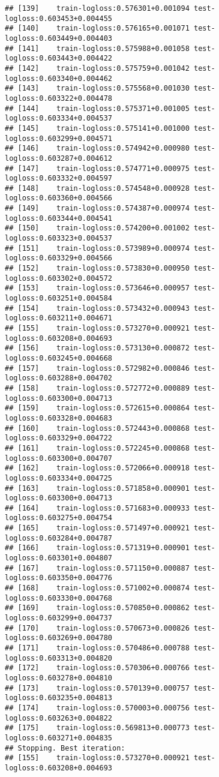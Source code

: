 \documentclass[
]{article}
\begin{document}
\begin{verbatim}
## [139]    train-logloss:0.576301+0.001094 test-logloss:0.603453+0.004455 
## [140]    train-logloss:0.576165+0.001071 test-logloss:0.603449+0.004403 
## [141]    train-logloss:0.575988+0.001058 test-logloss:0.603443+0.004422 
## [142]    train-logloss:0.575759+0.001042 test-logloss:0.603340+0.004462 
## [143]    train-logloss:0.575568+0.001030 test-logloss:0.603322+0.004478 
## [144]    train-logloss:0.575371+0.001005 test-logloss:0.603334+0.004537 
## [145]    train-logloss:0.575141+0.001000 test-logloss:0.603299+0.004571 
## [146]    train-logloss:0.574942+0.000980 test-logloss:0.603287+0.004612 
## [147]    train-logloss:0.574771+0.000975 test-logloss:0.603332+0.004597 
## [148]    train-logloss:0.574548+0.000928 test-logloss:0.603360+0.004566 
## [149]    train-logloss:0.574387+0.000974 test-logloss:0.603344+0.004541 
## [150]    train-logloss:0.574200+0.001002 test-logloss:0.603323+0.004537 
## [151]    train-logloss:0.573989+0.000974 test-logloss:0.603329+0.004566 
## [152]    train-logloss:0.573830+0.000950 test-logloss:0.603302+0.004572 
## [153]    train-logloss:0.573646+0.000957 test-logloss:0.603251+0.004584 
## [154]    train-logloss:0.573432+0.000943 test-logloss:0.603211+0.004671 
## [155]    train-logloss:0.573270+0.000921 test-logloss:0.603208+0.004693 
## [156]    train-logloss:0.573130+0.000872 test-logloss:0.603245+0.004668 
## [157]    train-logloss:0.572982+0.000846 test-logloss:0.603288+0.004702 
## [158]    train-logloss:0.572772+0.000889 test-logloss:0.603300+0.004713 
## [159]    train-logloss:0.572615+0.000864 test-logloss:0.603328+0.004683 
## [160]    train-logloss:0.572443+0.000868 test-logloss:0.603329+0.004722 
## [161]    train-logloss:0.572245+0.000868 test-logloss:0.603300+0.004707 
## [162]    train-logloss:0.572066+0.000918 test-logloss:0.603334+0.004725 
## [163]    train-logloss:0.571858+0.000901 test-logloss:0.603300+0.004713 
## [164]    train-logloss:0.571683+0.000933 test-logloss:0.603275+0.004754 
## [165]    train-logloss:0.571497+0.000921 test-logloss:0.603284+0.004787 
## [166]    train-logloss:0.571319+0.000901 test-logloss:0.603301+0.004807 
## [167]    train-logloss:0.571150+0.000887 test-logloss:0.603350+0.004776 
## [168]    train-logloss:0.571002+0.000874 test-logloss:0.603330+0.004768 
## [169]    train-logloss:0.570850+0.000862 test-logloss:0.603299+0.004737 
## [170]    train-logloss:0.570673+0.000826 test-logloss:0.603269+0.004780 
## [171]    train-logloss:0.570486+0.000788 test-logloss:0.603313+0.004820 
## [172]    train-logloss:0.570306+0.000766 test-logloss:0.603278+0.004810 
## [173]    train-logloss:0.570139+0.000757 test-logloss:0.603235+0.004813 
## [174]    train-logloss:0.570003+0.000756 test-logloss:0.603263+0.004822 
## [175]    train-logloss:0.569813+0.000773 test-logloss:0.603271+0.004835 
## Stopping. Best iteration:
## [155]    train-logloss:0.573270+0.000921 test-logloss:0.603208+0.004693
\end{verbatim}
\end{document}
